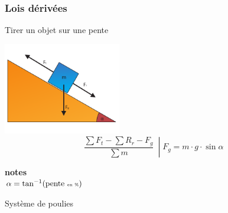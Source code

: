 \documentclass[12pt,a4paper]{article} %
\begin{document}
\subsubsection*{Lois dérivées}
Tirer un objet sur une pente \\
\begin{twocols}[0.5][0.5]
	\includegraphics[height=4cm]{Newton-Pente}
\nextcol
	\[
		\left.\frac{\sum F_t - \sum R_r - F_g}{\sum m}\:\middle|F_g = m \cdot g \cdot \sin\alpha
		\right.
	\]
	\par\vspace{0.5em}
	{\small \textbf{notes} \\
		$\alpha = \tan^{-1}(\text{pente {\tiny en \%}})$
	}
\end{twocols}
\par\vspace{1em}
Système de poulies \\
\end{document}

